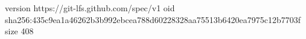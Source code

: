 version https://git-lfs.github.com/spec/v1
oid sha256:435c9ea1a46262b3b992ebcea788d60228328aa75513b6420ea7975c12b7703f
size 408
